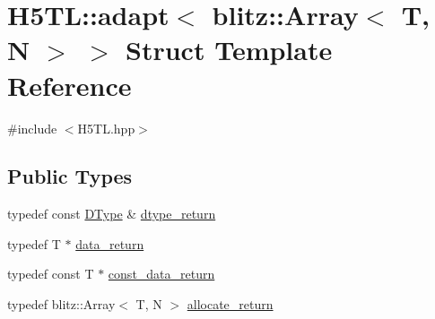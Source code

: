 \hypertarget{struct_h5_t_l_1_1adapt_3_01blitz_1_1_array_3_01_t_00_01_n_01_4_01_4}{\section{H5\-T\-L\-:\-:adapt$<$ blitz\-:\-:Array$<$ T, N $>$ $>$ Struct Template Reference}
\label{struct_h5_t_l_1_1adapt_3_01blitz_1_1_array_3_01_t_00_01_n_01_4_01_4}
}


{\ttfamily \#include $<$H5\-T\-L.\-hpp$>$}

\subsection*{Public Types}
\begin{DoxyCompactItemize}
\item 
typedef const \hyperlink{class_h5_t_l_1_1_d_type}{D\-Type} \& \hyperlink{struct_h5_t_l_1_1adapt_3_01blitz_1_1_array_3_01_t_00_01_n_01_4_01_4_af2875af95d8e3b980fcf97ce74363f52}{dtype\-\_\-return}
\item 
typedef T $\ast$ \hyperlink{struct_h5_t_l_1_1adapt_3_01blitz_1_1_array_3_01_t_00_01_n_01_4_01_4_a0e4d35a2e0a1c22042107b22afea18a4}{data\-\_\-return}
\item 
typedef const T $\ast$ \hyperlink{struct_h5_t_l_1_1adapt_3_01blitz_1_1_array_3_01_t_00_01_n_01_4_01_4_add4a9236bffd7861aa0bb5972c78221f}{const\-\_\-data\-\_\-return}
\item 
typedef blitz\-::\-Array$<$ T, N $>$ \hyperlink{struct_h5_t_l_1_1adapt_3_01blitz_1_1_array_3_01_t_00_01_n_01_4_01_4_a36fe01410b3795e22c6841dc5b616191}{allocate\-\_\-return}
\end{DoxyCompactItemize}
